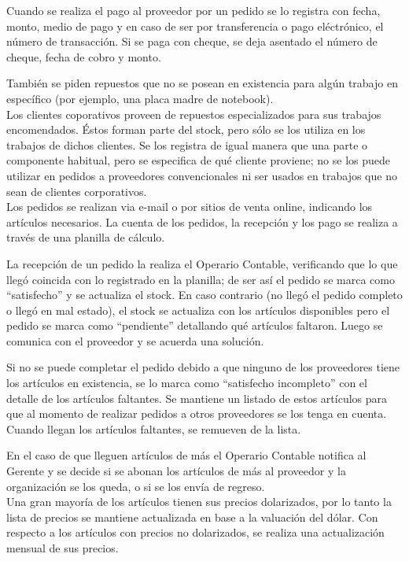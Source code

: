 \documentclass[12pt]{extarticle}
\begin{document}
\begin{spacing}{1.2}
        Cuando se realiza el pago al proveedor por un pedido se lo registra con fecha, monto, medio de pago y en caso de ser por transferencia o pago eléctrónico, el número de transacción. Si se paga con cheque, se deja asentado el número de cheque, fecha de cobro y monto.

        También se piden repuestos que no se posean en existencia para algún trabajo en específico (por ejemplo, una placa madre de notebook).\\

        Los clientes coporativos proveen de repuestos especializados para sus trabajos encomendados. Éstos forman parte del stock, pero sólo se los utiliza en los trabajos de dichos clientes. Se los registra de igual manera que una parte o componente habitual, pero se especifica de qué cliente proviene; no se los puede utilizar en pedidos a proveedores convencionales ni ser usados en trabajos que no sean de clientes corporativos.\\

        Los pedidos se realizan via e-mail o por sitios de venta online, indicando los artículos necesarios. La cuenta de los pedidos, la recepción y los pago se realiza a través de una planilla de cálculo. 

        La recepción de un pedido la realiza el Operario Contable, verificando que lo que llegó coincida con lo registrado en la planilla; de ser así el pedido se marca como ``satisfecho'' y se actualiza el stock. En caso contrario (no llegó el pedido completo o llegó en mal estado), el stock se actualiza con los artículos disponibles pero el pedido se marca como ``pendiente'' detallando qué artículos faltaron. Luego se comunica con el proveedor y se acuerda una solución.

        Si no se puede completar el pedido debido a que ninguno de los proveedores tiene los artículos en existencia, se lo marca como ``satisfecho incompleto'' con el detalle de los artículos faltantes. Se mantiene un listado de estos artículos para que al momento de realizar pedidos a otros proveedores se los tenga en cuenta. Cuando llegan los artículos faltantes, se remueven de la lista.

        En el caso de que lleguen artículos de más el Operario Contable notifica al Gerente y se decide si se abonan los artículos de más al proveedor y la organización se los queda, o si se los envía de regreso.\\

        Una gran mayoría de los artículos tienen sus precios dolarizados, por lo tanto la lista de precios se mantiene actualizada en base a la valuación del dólar. Con respecto a los artículos con precios no dolarizados, se realiza una actualización mensual de sus precios.


\end{spacing}
\end{document}
